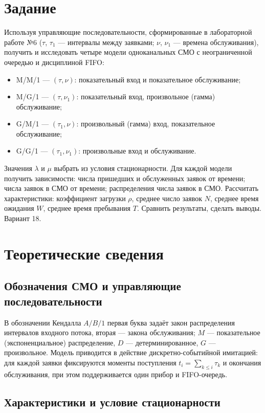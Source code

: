 \documentclass[a4paper,14pt,oneside,openany]{memoir}
\begin{document}
\section*{Задание}
Используя управляющие последовательности, сформированные в лабораторной работе №6 ($\tau$, $\tau_1$ --- интервалы между заявками; $\nu$, $\nu_1$ --- времена обслуживания), получить и исследовать четыре модели одноканальных СМО с неограниченной очередью и дисциплиной FIFO:
\begin{itemize}
    \item M/M/1 --- $(\tau, \nu)$: показательный вход и показательное обслуживание;
    \item M/G/1 --- $(\tau, \nu_1)$: показательный вход, произвольное (гамма) обслуживание;
    \item G/M/1 --- $(\tau_1, \nu)$: произвольный (гамма) вход, показательное обслуживание;
    \item G/G/1 --- $(\tau_1, \nu_1)$: произвольные вход и обслуживание.
\end{itemize}
Значения $\lambda$ и $\mu$ выбрать из условия стационарности. Для каждой модели получить зависимости: числа пришедших и обслуженных заявок от времени; числа заявок в СМО от времени; распределения числа заявок в СМО. Рассчитать характеристики: коэффициент загрузки $\rho$, среднее число заявок $N$, среднее время ожидания $W$, среднее время пребывания $T$. Сравнить результаты, сделать выводы. Вариант 18.

\section{Теоретические сведения}

\subsection{Обозначения СМО и управляющие последовательности}

В обозначении Кендалла $A/B/1$ первая буква задаёт закон распределения интервалов входного потока, вторая --- закона обслуживания; $M$ --- показательное (экспоненциальное) распределение, $D$ --- детерминированное, $G$ --- произвольное. Модель приводится в действие дискретно-событийной имитацией: для каждой заявки фиксируются моменты поступления $t_i=\sum_{k\le i}\tau_k$ и окончания обслуживания, при этом поддерживается один прибор и FIFO-очередь.

\subsection{Характеристики и условие стационарности}
\end{document}
